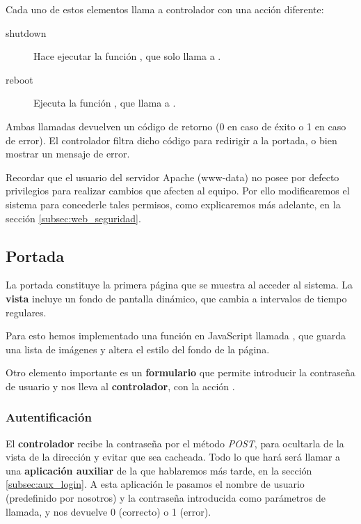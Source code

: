 \smallskip

Cada uno de estos elementos llama a controlador con una acción diferente:

\begin{description}
	\item[shutdown] Hace ejecutar la función , que solo llama a .

	\item[reboot] Ejecuta la función , que llama a .
\end{description}

Ambas llamadas devuelven un código de retorno (0 en caso de éxito o 1 en caso de error). El controlador filtra dicho código para redirigir a la portada, o bien mostrar un mensaje de error.

Recordar que el usuario del servidor Apache (www-data) no posee por defecto privilegios para realizar cambios que afecten al equipo. Por ello modificaremos el sistema para concederle tales permisos, como explicaremos más adelante, en la sección \ref{subsec:web_seguridad}.

\subsection{Portada}

La portada constituye la primera página que se muestra al acceder al sistema. La \textbf{vista} incluye un fondo de pantalla dinámico, que cambia a intervalos de tiempo regulares.

Para esto hemos implementado una función en JavaScript llamada , que guarda una lista de imágenes y altera el estilo del fondo de la página.

Otro elemento importante es un \textbf{formulario} que permite introducir la contraseña de usuario y nos lleva al \textbf{controlador}, con la acción .

\subsubsection{Autentificación}

El \textbf{controlador} recibe la contraseña por el método \textit{POST}, para ocultarla de la vista de la dirección y evitar que sea cacheada. Todo lo que hará será llamar a una \textbf{aplicación auxiliar} de la que hablaremos más tarde, en la sección \ref{subsec:aux_login}. A esta aplicación le pasamos el nombre de usuario (predefinido por nosotros) y la contraseña introducida como parámetros de llamada, y nos devuelve 0 (correcto) o 1 (error).

